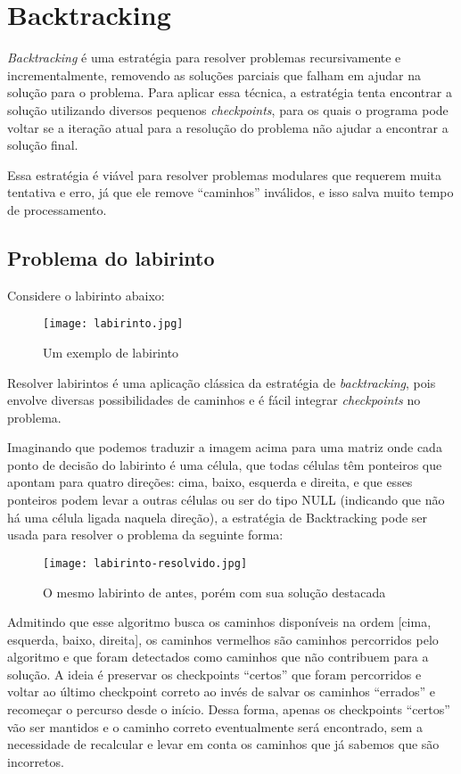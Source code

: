 \section{Backtracking} \label{sec:backtracking}

\emph{Backtracking} é uma estratégia para resolver problemas recursivamente e incrementalmente,
removendo as soluções parciais que falham em ajudar na solução para o problema. Para aplicar
essa técnica, a estratégia tenta encontrar a solução utilizando diversos pequenos \emph{checkpoints},
para os quais o programa pode voltar se a iteração atual para a resolução do problema não ajudar a
encontrar a solução final.

Essa estratégia é viável para resolver problemas modulares que requerem muita tentativa e erro, 
já que ele remove “caminhos” inválidos, e isso salva muito tempo de processamento.

\subsection{Problema do labirinto}

Considere o labirinto abaixo:

\begin{figure}[ht]
  \centering
  \texttt{[image: labirinto.jpg]}
  \caption{Um exemplo de labirinto}
  \label{fig:labirinto}
\end{figure}

Resolver labirintos é uma aplicação clássica da estratégia de \emph{backtracking},
pois envolve diversas possibilidades de caminhos e é fácil integrar \emph{checkpoints} no problema.

Imaginando que podemos traduzir a imagem acima para uma matriz onde cada ponto de 
decisão do labirinto é uma célula, que todas células têm ponteiros que apontam para 
quatro direções: cima, baixo, esquerda e direita, e que esses ponteiros podem levar 
a outras células ou ser do tipo NULL (indicando que não há uma célula ligada naquela direção),
a estratégia de Backtracking pode ser usada para resolver o problema da seguinte forma:

\begin{figure}[ht]
  \centering
  \texttt{[image: labirinto-resolvido.jpg]}
  \caption{O mesmo labirinto de antes, porém com sua solução destacada}
  \label{fig:labirinto-resolvido}
\end{figure}

Admitindo que esse algoritmo busca os caminhos disponíveis na ordem [cima, esquerda, baixo, direita],
os caminhos vermelhos são caminhos percorridos pelo algoritmo e que foram detectados como caminhos
que não contribuem para a solução. A ideia é preservar os checkpoints “certos” que foram percorridos
e voltar ao último checkpoint correto ao invés de salvar os caminhos “errados” e recomeçar o percurso
desde o início. Dessa forma, apenas os checkpoints “certos” vão ser mantidos e o caminho correto
eventualmente será encontrado, sem a necessidade de recalcular e levar em conta os caminhos que 
já sabemos que são incorretos.

